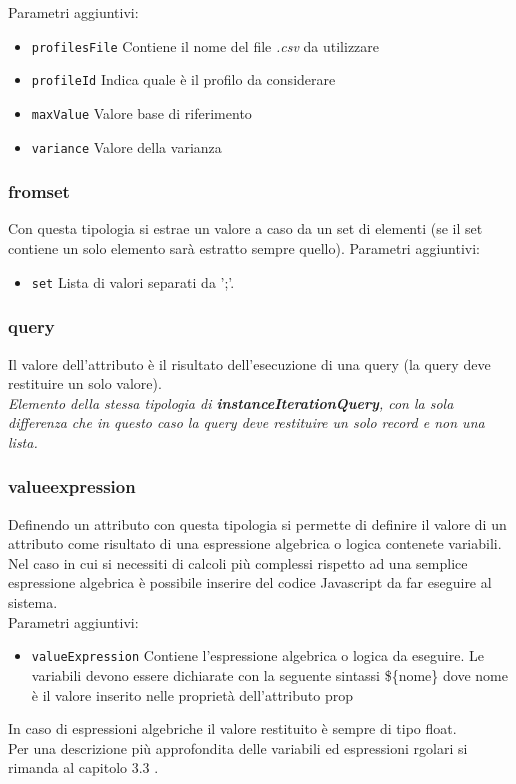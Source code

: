 \documentclass[12pt,a4paper,italian]{article}
\begin{document}
Parametri aggiuntivi:
\begin{itemize}
	\item \texttt{profilesFile} Contiene il nome del file \emph{.csv} da utilizzare
	\item \texttt{profileId} Indica quale è il profilo da considerare
	\item \texttt{maxValue} Valore base di riferimento 
	\item \texttt{variance} Valore della varianza 
\end{itemize}  


\subsubsection{fromset} 
Con questa tipologia si estrae un valore a caso da un set di elementi (se il set contiene un solo elemento sarà estratto sempre quello).
Parametri aggiuntivi:
\begin{itemize}
	\item \texttt{set} Lista di valori separati da ';'.
\end{itemize}
\subsubsection{query} Il valore dell'attributo è il risultato dell'esecuzione di una query (la query deve restituire un solo valore).\\
\newline
\emph{Elemento della stessa tipologia di \textbf{instanceIterationQuery}, con la sola differenza che in questo caso la query deve restituire un solo record e non una lista.}\\
\subsubsection{valueexpression} Definendo un attributo con questa tipologia si permette di definire il valore di un attributo come risultato di una espressione  algebrica o logica contenete variabili.\\
 Nel caso in cui si necessiti di calcoli più complessi rispetto ad una semplice espressione algebrica è possibile inserire del codice Javascript da far eseguire al sistema.
\\Parametri aggiuntivi:
\begin{itemize}
	\item \texttt{valueExpression} Contiene l'espressione algebrica o logica da eseguire. Le variabili devono essere dichiarate con la seguente sintassi \$\{nome\} dove nome è il valore inserito nelle proprietà dell'attributo prop
\end{itemize}
In caso di espressioni algebriche il valore restituito è sempre di tipo float.\\
Per una descrizione più approfondita delle variabili ed espressioni rgolari si rimanda al capitolo 3.3 .
\end{document}
